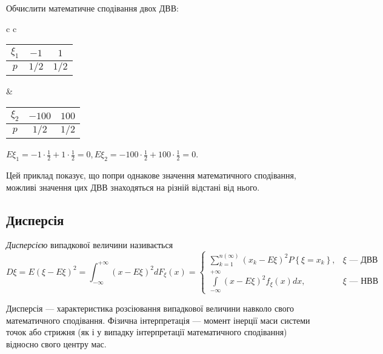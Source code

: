 \begin{example}
    Обчислити математичне сподівання двох ДВВ:
    
    \begin{tabular}{c c}
        \begin{tabular}{c|c|c}
            $\xi_1$ & $-1$ & $1$ \\ 
            \hline
            $p$ & $1/2$ & $1/2$
        \end{tabular} &
        \begin{tabular}{c|c|c}
            $\xi_2$ & $-100$ & $100$ \\ 
            \hline
            $p$ & $1/2$ & $1/2$
        \end{tabular}
    \end{tabular}
    $E\xi_1 = -1\cdot \frac{1}{2} + 1\cdot \frac{1}{2} = 0, E\xi_2 = -100\cdot \frac{1}{2} + 100\cdot \frac{1}{2} = 0$.
    
    Цей приклад показує, що попри однакове значення математичного сподівання, можливі значення цих ДВВ знаходяться на різній відстані від нього.
\end{example}

\subsection{Дисперсія}
\begin{definition}
    \emph{Дисперсією} випадкової величини називається 
    \begin{equation}\label{eq:d_xi}
        D\xi = E\left(\xi-E\xi\right)^2 = \int_{-\infty}^{+\infty} \left(x-E\xi\right)^2 dF_\xi(x) = \begin{cases}
            \sum\limits_{k=1}^{n(\infty)} \left(x_k-E\xi\right)^2 P\left\{\xi = x_k\right\}, & \xi \text{ --- ДВВ} \\
            \int\limits_{-\infty}^{+\infty} \left(x-E\xi\right)^2 f_\xi(x)dx, & \xi \text{ --- НВВ}
        \end{cases}
    \end{equation}
\end{definition}
Дисперсія --- характеристика розсіювання випадкової величини навколо свого математичного сподівання.
Фізична інтерпретація --- момент інерції маси системи точок або стрижня (як і у випадку інтерпретації математичного сподівання)
відносно свого центру мас.

